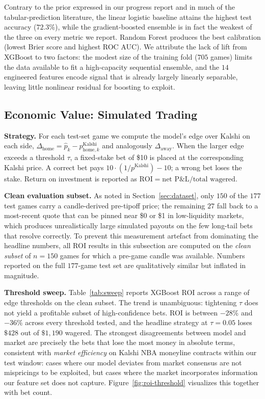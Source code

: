 Contrary to the prior expressed in our progress report and in much of
the tabular-prediction literature, the linear logistic baseline
attains the highest test accuracy ($72.3\%$), while the gradient-boosted
ensemble is in fact the weakest of the three on every metric we
report. Random Forest produces the best calibration (lowest Brier
score and highest ROC AUC). We attribute the lack of lift from
XGBoost to two factors: the modest size of the training fold ($705$
games) limits the data available to fit a high-capacity sequential
ensemble, and the $14$ engineered features encode signal that is
already largely linearly separable, leaving little nonlinear residual
for boosting to exploit.

\subsection{Economic Value: Simulated Trading}

\textbf{Strategy.}
For each test-set game we compute the model's edge over Kalshi on each
side, $\Delta_{\text{home}} = \hat{p}_k -
p^{\text{Kalshi}}_{\text{home},k}$ and analogously
$\Delta_{\text{away}}$. When the larger edge exceeds a threshold
$\tau$, a fixed-stake bet of \$10 is placed at the corresponding
Kalshi price. A correct bet pays
$10\cdot(1/p^{\text{Kalshi}}) - 10$; a wrong bet loses the stake.
Return on investment is reported as
$\text{ROI} = \text{net P\&L} / \text{total wagered}$.

\textbf{Clean evaluation subset.}
As noted in Section~\ref{sec:dataset}, only $150$ of the $177$ test
games carry a candle-derived pre-tipoff price; the remaining $27$
fall back to a most-recent quote that can be pinned near \$0 or \$1
in low-liquidity markets, which produces unrealistically large
simulated payouts on the few long-tail bets that resolve correctly.
To prevent this measurement artefact from dominating the headline
numbers, all ROI results in this subsection are computed on the
\emph{clean subset} of $n=150$ games for which a pre-game candle was
available. Numbers reported on the full $177$-game test set are
qualitatively similar but inflated in magnitude.

\textbf{Threshold sweep.}
Table~\ref{tab:sweep} reports XGBoost ROI across a range of edge
thresholds on the clean subset. The trend is unambiguous: tightening
$\tau$ does not yield a profitable subset of high-confidence bets.
ROI is between $-28\%$ and $-36\%$ across every threshold tested, and
the headline strategy at $\tau=0.05$ loses $\$428$ out of $\$1{,}190$
wagered. The strongest disagreements between model and market are
precisely the bets that lose the most money in absolute terms,
consistent with \emph{market efficiency} on Kalshi NBA moneyline
contracts within our test window: cases where our model deviates from
market consensus are not mispricings to be exploited, but cases where
the market incorporates information our feature set does not capture.
Figure~\ref{fig:roi-threshold} visualizes this together with bet count.

